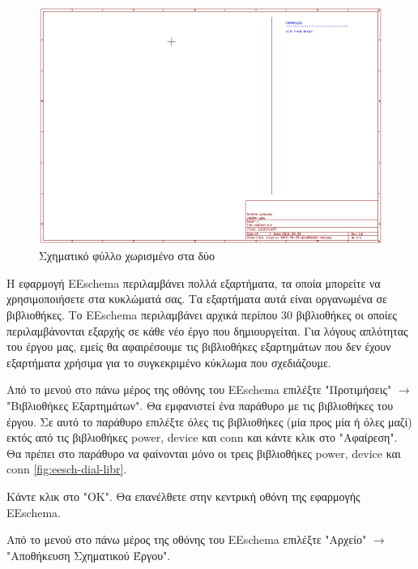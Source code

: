 \documentclass[a4paper]{article}
\begin{document}
\begin{figure}
  \begin{center}
    \includegraphics[width=.9\textwidth]{img/eesch-main-lines.png}
    \caption{Σχηματικό φύλλο χωρισμένο στα δύο}
    \label{fig:eesch-main-lines}
  \end{center}
\end{figure}

Η εφαρμογή \textenglish{EEschema} περιλαμβάνει πολλά εξαρτήματα, τα οποία μπορείτε να χρησιμοποιήσετε στα κυκλώματά σας. Τα εξαρτήματα αυτά είναι οργανωμένα σε βιβλιοθήκες. Το \textenglish{EEschema} περιλαμβάνει αρχικά περίπου 30 βιβλιοθήκες οι οποίες περιλαμβάνονται εξαρχής σε κάθε νέο έργο που δημιουργείται. Για λόγους απλότητας του έργου μας, εμείς θα αφαιρέσουμε τις βιβλιοθήκες εξαρτημάτων που δεν έχουν εξαρτήματα χρήσιμα για το συγκεκριμένο κύκλωμα που σχεδιάζουμε.

Από το μενού στο πάνω μέρος της οθόνης του \textenglish{EEschema} επιλέξτε "Προτιμήσεις" $\rightarrow$ "Βιβλιοθήκες Εξαρτημάτων". Θα εμφανιστεί ένα παράθυρο με τις βιβλιοθήκες του έργου. Σε αυτό το παράθυρο επιλέξτε όλες τις βιβλιοθήκες (μία προς μία ή όλες μαζί) εκτός από τις βιβλιοθήκες power, device και conn και κάντε κλικ στο "Αφαίρεση". Θα πρέπει στο παράθυρο να φαίνονται μόνο οι τρεις βιβλιοθήκες power, device και conn \ref{fig:eesch-dial-libr}. 

Κάντε κλικ στο "ΟΚ". Θα επανέλθετε στην κεντρική οθόνη της εφαρμογής \textenglish{EEschema}.

Από το μενού στο πάνω μέρος της οθόνης του \textenglish{EEschema} επιλέξτε "Αρχείο" $\rightarrow$ "Αποθήκευση Σχηματικού Έργου".
\end{document}

